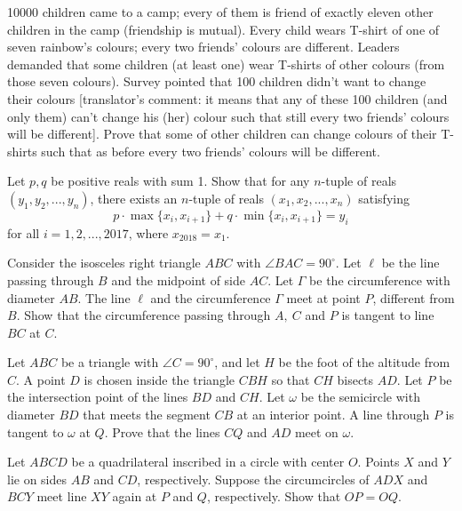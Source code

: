 \documentclass[11pt]{scrartcl}
\begin{document}
\begin{problem}[4527883777563937913]
10000 children came to a camp; every of them is friend of exactly eleven other children in the camp (friendship is mutual). Every child wears T-shirt of one of seven rainbow's colours; every two friends' colours are different. Leaders demanded that some children (at least one) wear T-shirts of other colours (from those seven colours). Survey pointed that 100 children didn't want to change their colours [translator's comment: it means that any of these 100 children (and only them) can't change his (her) colour such that still every two friends' colours will be different]. Prove that some of other children can change colours of their T-shirts such that as before every two friends' colours will be different.
\end{problem}
\begin{problem}[4561021900663360180]
	Let $p,q$ be positive reals with sum 1. Show that for any $n$-tuple of reals $(y_1,y_2,...,y_n)$, there exists an $n$-tuple of reals $(x_1,x_2,...,x_n)$ satisfying$$p\cdot \max\{x_i,x_{i+1}\} + q\cdot \min\{x_i,x_{i+1}\} = y_i$$for all $i=1,2,...,2017$, where $x_{2018}=x_1$.
\end{problem}
\begin{problem}[4576482737766940742]
Consider the isosceles right triangle $ABC$ with $\angle BAC = 90^\circ$. Let $\ell$ be the line passing through $B$ and the midpoint of side $AC$. Let $\Gamma$ be the circumference with diameter $AB$. The line $\ell$ and the circumference $\Gamma$ meet at point $P$, different from $B$. Show that the circumference passing through $A,\ C$ and $P$ is tangent to line $BC$ at $C$.
\end{problem}
\begin{problem}[4582918044793570936]
Let $ABC$ be a triangle with $\angle{C} = 90^{\circ}$, and let $H$ be the foot of the altitude from $C$. A point $D$ is chosen inside the triangle $CBH$ so that $CH$ bisects $AD$. Let $P$ be the intersection point of the lines $BD$ and $CH$. Let $\omega$ be the semicircle with diameter $BD$ that meets the segment $CB$ at an interior point. A line through $P$ is tangent to $\omega$ at $Q$. Prove that the lines $CQ$ and $AD$ meet on $\omega$.
\end{problem}
\begin{problem}[4603228855421380865]
	Let $ABCD$ be a quadrilateral inscribed in a circle with center $O$. Points $X$ and $Y$ lie on sides $AB$ and $CD$, respectively. Suppose the circumcircles of $ADX$ and $BCY$ meet line $XY$ again at $P$ and $Q$, respectively. Show that $OP=OQ$.
\end{problem}
\end{document}
